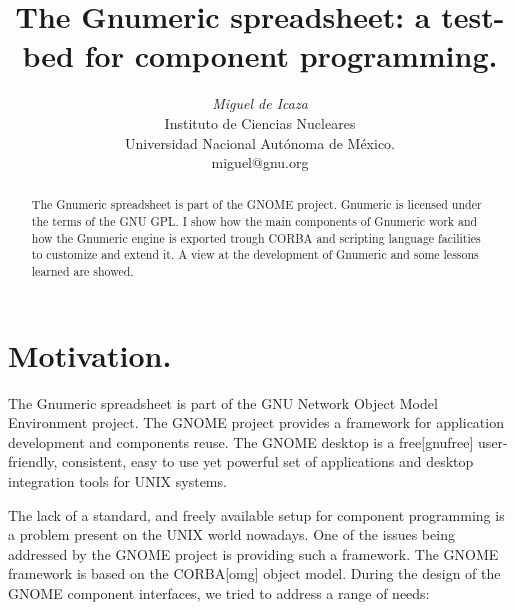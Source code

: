 \documentclass[12pt,twoside,twocolumn]{article}
\begin{document}
\title{The Gnumeric spreadsheet: a test-bed for component programming.}

\author{
	\textit{Miguel de Icaza}\\
	Instituto de Ciencias Nucleares \\
	Universidad Nacional Aut\'onoma de M\'exico.\\
	\small
	miguel@gnu.org\\
}

\maketitle

\begin{abstract}
The Gnumeric spreadsheet is part of the GNOME project.  Gnumeric is
licensed under the terms of the GNU GPL.  I show how the main
components of Gnumeric work and how the Gnumeric engine is exported
trough CORBA and scripting language facilities to customize and extend
it.  A view at the development of Gnumeric and some lessons
learned are showed.
\end{abstract}



\section{Motivation.}

The Gnumeric spreadsheet is part of the GNU Network Object Model
Environment \cite{gnome} project.  The GNOME project provides a framework
for application development and components reuse.  The GNOME desktop
is a free[gnufree] user-friendly, consistent, easy to use yet powerful set
of applications and desktop integration tools for UNIX systems.

The lack of a standard, and freely available setup for component
programming is a problem present on the UNIX world nowadays.  One of
the issues being addressed by the GNOME project is providing such a
framework.  The GNOME framework is based on the CORBA[omg] object
model.  During the design of the GNOME component interfaces, we tried
to address a range of needs:
\end{document}
